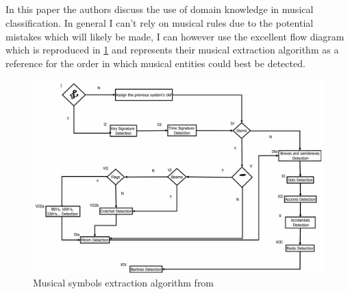 \subsection{\cite{rebelo2011method}}

In this paper the authors discuss the use of domain knowledge in musical classification. In general I can't rely on musical rules due to the potential mistakes which will likely be made, I can however use the excellent flow diagram which is reproduced in \cref{fig:arebelo-flow} and represents their musical extraction algorithm as a reference for the order in which musical entities could best be detected.

\begin{figure}[H]
  \includegraphics[width=\linewidth]{gfx/prior-research/arebelo-flow.png}
  \caption{Musical symbols extraction algorithm from \cite{rebelo2011method}}
  \label{fig:arebelo-flow}
\end{figure}
